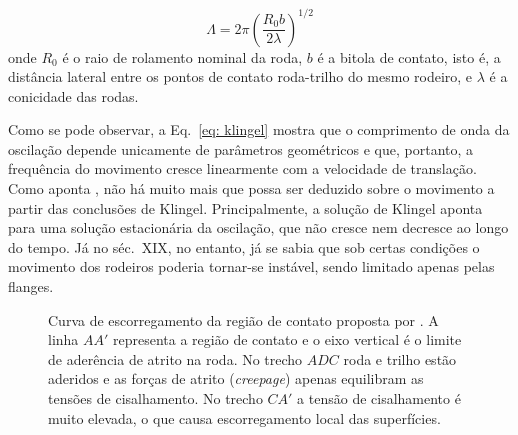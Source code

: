 \begin{equation}
    \Lambda = 2\pi \left(\frac{R_0 b}{2\lambda}\right)^{1/2}
    \label{eq: klingel}
\end{equation}
onde $R_0$ é o raio de rolamento nominal da roda, $b$ é a bitola de contato, isto é, a distância lateral entre os pontos de contato roda-trilho
do mesmo rodeiro, e $\lambda$ é a conicidade das rodas.

Como se pode observar, a Eq.~\eqref{eq: klingel} mostra que o comprimento de onda da oscilação depende unicamente de parâmetros geométricos e que,
portanto, a frequência do movimento cresce linearmente com a velocidade de translação. Como aponta , não há muito mais que possa 
ser deduzido sobre o movimento a partir das conclusões de Klingel. Principalmente, a solução de Klingel aponta para uma solução estacionária da oscilação,
que não cresce nem decresce ao longo do tempo. Já no séc.~XIX, no entanto, já se sabia que sob certas condições o movimento dos rodeiros poderia tornar-se
instável, sendo limitado apenas pelas flanges.

\begin{figure}
    \centering
    \caption{Curva de escorregamento da região de contato proposta por . A linha $AA'$ representa
    a região de contato e o eixo vertical é o limite de aderência de atrito na roda. No trecho $ADC$ roda e trilho estão aderidos e
    as forças de atrito (\textit{creepage}) apenas equilibram as tensões de cisalhamento. No trecho $CA'$ a tensão de cisalhamento
    é muito elevada, o que causa escorregamento local das superfícies.}
    \label{fig: creep carter}
\end{figure}

